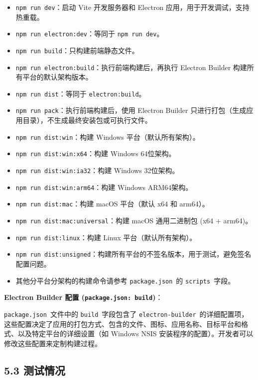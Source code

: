 \documentclass{article}
\begin{document}
\begin{itemize}
    \item \texttt{npm run dev}：启动 Vite 开发服务器和 Electron 应用，用于开发调试，支持热重载。
    \item \texttt{npm run electron:dev}：等同于 \texttt{npm run dev}。
    \item \texttt{npm run build}：只构建前端静态文件。
    \item \texttt{npm run electron:build}：执行前端构建后，再执行 Electron Builder 构建所有平台的默认架构版本。
    \item \texttt{npm run dist}：等同于 \texttt{electron:build}。
    \item \texttt{npm run pack}：执行前端构建后，使用 Electron Builder 只进行打包（生成应用目录），不生成最终安装包或可执行文件。
    \item \texttt{npm run dist:win}：构建 Windows 平台（默认所有架构）。
    \item \texttt{npm run dist:win:x64}：构建 Windows 64位架构。
    \item \texttt{npm run dist:win:ia32}：构建 Windows 32位架构。
    \item \texttt{npm run dist:win:arm64}：构建 Windows ARM64架构。
    \item \texttt{npm run dist:mac}：构建 macOS 平台（默认 x64 和 arm64）。
    \item \texttt{npm run dist:mac:universal}：构建 macOS 通用二进制包 (x64 + arm64)。
    \item \texttt{npm run dist:linux}：构建 Linux 平台（默认所有架构）。
    \item \texttt{npm run dist:unsigned}：构建所有平台的不签名版本，用于测试，避免签名配置问题。
    \item 其他分平台分架构的构建命令请参考 \texttt{package.json}\ 的 \texttt{scripts}\ 字段。
\end{itemize}

\textbf{Electron Builder 配置 (\texttt{package.json: build})}：

\texttt{package.json}\ 文件中的 \texttt{build}\ 字段包含了 \texttt{electron-builder}\ 的详细配置项，这些配置决定了应用的打包方式、包含的文件、图标、应用名称、目标平台和格式、以及特定平台的详细设置（如 Windows NSIS 安装程序的配置）。开发者可以修改这些配置来定制构建过程。

\subsection*{5.3 测试情况}
\end{document}
